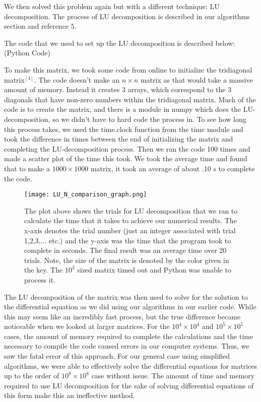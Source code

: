\documentclass{article}
\begin{document}
We then solved this problem again but with a different technique: LU decomposition. The process of LU decomposition is described in our algorithms section and reference ${5}$. 

The code that we used to set up the LU decomposition is described below: (Python Code)



To make this matrix, we took some code from online to initialize the tridiagonal matrix$^{[4]}$. The code doesn't make an $n\times n$ matrix as that would take a massive amount of memory. Instead it creates 3 arrays, which correspond to the 3 diagonals that have non-zero numbers within the tridiagonal matrix. Much of the code is to create the matrix, and there is a module in numpy which does the LU-decomposition, so we didn't have to hard code the process in. To see how long this process takes, we used the time.clock function from the time module and took the difference in times between the end of initializing the matrix and completing the LU-decomposition process. Then we ran the code 100 times and made a scatter plot of the time this took. We took the average time and found that to make a $1000\times1000$ matrix, it took an average of about .10 s to complete the code.

\begin{figure}[h!]
	\centering
	\texttt{[image: LU\_N\_comparison\_graph.png]}
	\caption{The plot above shows the trials for LU decomposition that we ran to calculate the time that it takes to achieve our numerical results. The x-axis denotes the trial number (just an integer associated with trial 1,2,3,... etc.) and the y-axis was the time that the program took to complete in seconds. The final result was an average time over 20 trials. Note, the size of the matrix is denoted by the color given in the key. The $10^{3}$ sized matrix timed out and Python was unable to process it.}
\end{figure}


The LU decomposition of the matrix was then used to solve for the solution to the differential equation as we did using our algorithms in our earlier code. While this may seem like an incredibly fast process, but the true difference became noticeable when we looked at larger matrices. For the $10^{4}\times 10^{4}$ and $10^{5}\times 10^{5}$ cases, the amount of memory required to complete the calculations and the time necessary to compile the code caused errors in our computer systems. Thus, we saw the fatal error of this approach. For our general case using simplified algorithms, we were able to effectively solve the differential equations for matrices up to the order of $10^{8}\times 10^{8}$ case without issue. The amount of time and memory required to use LU decomposition for the sake of solving differential equations of this form make this an ineffective method. 
\end{document}
